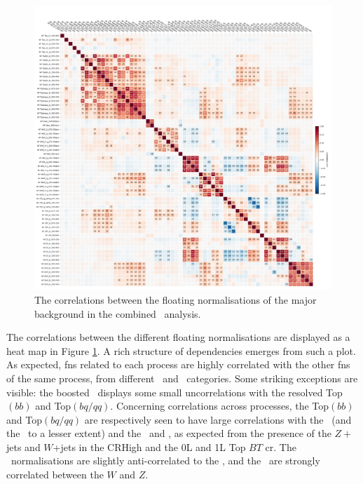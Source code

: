 \begin{figure}[h!]
    \hspace{-1.5cm}
    \includegraphics[width=1.15\textwidth]{Images/VH/Fit/fromSlides/SMVHbbcc_2022_MVA_mc16ade_v14.fit_012_fullRes_VHbb_fit_012_012_mc16ade_Systs_mva_VHbbcc_AsimovFit_conditional_mu1_Cov_BTag}
    \caption{The correlations between the floating normalisations of the major background in the combined \vhbc\ analysis.}
    \label{fig:FNcorr}
\end{figure} 

The correlations between the different floating normalisations are displayed as a heat map in Figure \ref{fig:FNcorr}. A rich structure of dependencies emerges from such a plot. As expected, \glspl{fn} related to each process are highly correlated with the other \glspl{fn} of the same process, from different \ptv\ and \nj\ categories. Some striking exceptions are visible: the boosted \ttb\ displays some small uncorrelations with the resolved Top$(bb)$ and Top$(bq/qq)$. Concerning correlations across processes, the Top$(bb)$ and Top$(bq/qq)$ are respectively seen to have large correlations with the \zhf\ (and the \whf\ to a lesser extent) and the \wmf\ and \zmf, as expected from the presence of the $Z+$jets and $W$+jets in the CRHigh and the 0L and 1L Top $BT$ \gls{cr}. The \vhf\ normalisations are slightly anti-correlated to the \vlf, and the \vlf\ are strongly correlated between the $W$ and $Z$.

